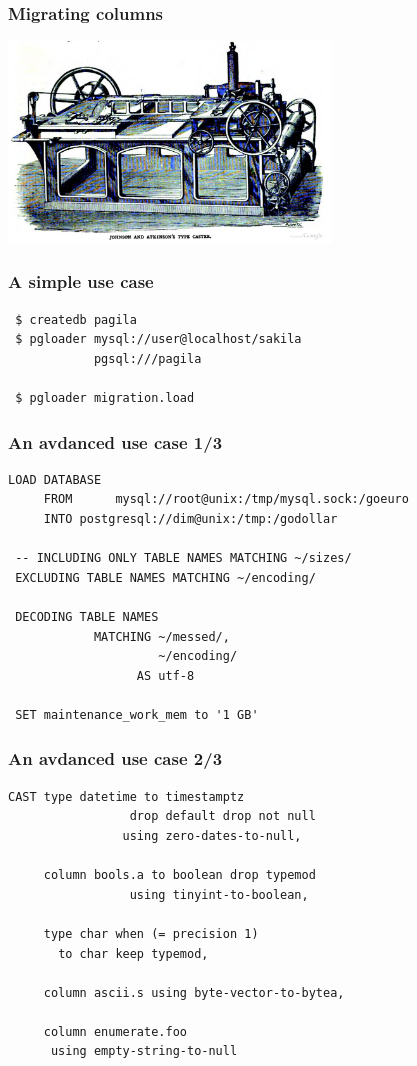 \documentclass{beamer}
\begin{document}
\begin{frame}
  \frametitle{Migrating columns}

  
  \begin{center}
    \includegraphics[height=2.1in]{type-casting-machine.jpg}
  \end{center}
\end{frame}

\begin{frame}[fragile]
  \frametitle{A simple use case}

  \vfill

\begin{verbatim}
 $ createdb pagila
 $ pgloader mysql://user@localhost/sakila
            pgsql:///pagila

 $ pgloader migration.load
\end{verbatim}
\end{frame}

\begin{frame}[fragile]
  \frametitle{An avdanced use case 1/3}

\begin{verbatim}
LOAD DATABASE
     FROM      mysql://root@unix:/tmp/mysql.sock:/goeuro
     INTO postgresql://dim@unix:/tmp:/godollar

 -- INCLUDING ONLY TABLE NAMES MATCHING ~/sizes/
 EXCLUDING TABLE NAMES MATCHING ~/encoding/

 DECODING TABLE NAMES
            MATCHING ~/messed/,
                     ~/encoding/
                  AS utf-8

 SET maintenance_work_mem to '1 GB'
\end{verbatim}
\end{frame}

\begin{frame}[fragile]
  \frametitle{An avdanced use case 2/3}

\begin{verbatim}
CAST type datetime to timestamptz
                 drop default drop not null
                using zero-dates-to-null,

     column bools.a to boolean drop typemod
                 using tinyint-to-boolean,

     type char when (= precision 1)
       to char keep typemod,

     column ascii.s using byte-vector-to-bytea,

     column enumerate.foo
      using empty-string-to-null
\end{verbatim}
\end{frame}
\end{document}
